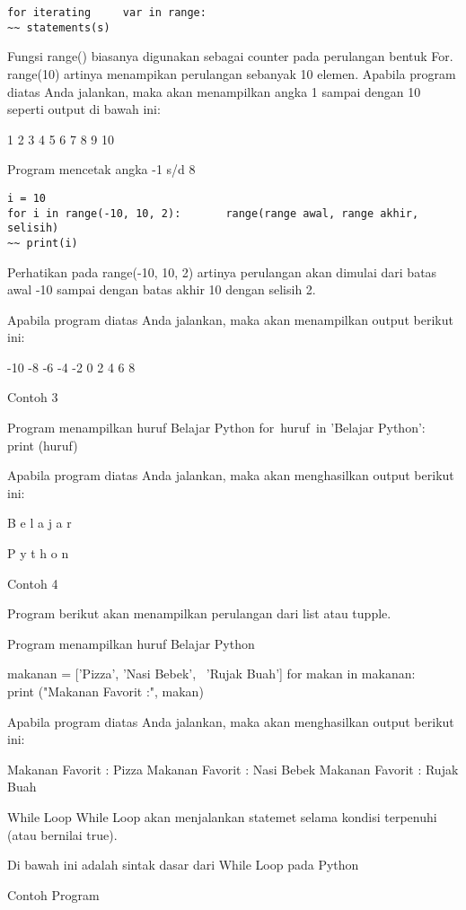 \begin{verbatim} 
for iterating     var in range: 
~~ statements(s) 
\end{verbatim}

Fungsi   range()   biasanya digunakan sebagai counter pada perulangan bentuk For. range(10) artinya menampikan perulangan sebanyak 10 elemen.
Apabila program diatas Anda jalankan, maka akan menampilkan angka 1 sampai dengan 10 seperti output di bawah ini:

 
1 
2 
3 
4 
5 
6 
7 
8 
9 
10 
 
 Program mencetak angka -1 s/d 8 
\begin{verbatim}
i = 10 
for i in range(-10, 10, 2):       range(range awal, range akhir, selisih) 
~~ print(i) 
\end{verbatim}

Perhatikan pada range(-10, 10, 2) artinya perulangan akan dimulai dari batas awal -10 sampai dengan batas akhir 10 dengan selisih 2.

Apabila program diatas Anda jalankan, maka akan menampilkan output berikut ini:

 
-10 
-8 
-6 
-4 
-2 
0 
2 
4 
6 
8 

Contoh 3

 
Program menampilkan huruf Belajar Python 
for~huruf~in 'Belajar Python':    
~~ print (huruf) 

Apabila program diatas Anda jalankan, maka akan menghasilkan output berikut ini:

 
B 
e 
l 
a 
j 
a 
r 
  
P 
y 
t 
h 
o 
n 

Contoh 4

Program berikut akan menampilkan perulangan dari list atau tupple.

 
Program menampilkan huruf Belajar Python 

makanan = ['Pizza', 'Nasi Bebek',~ 'Rujak Buah'] 
for makan in makanan: 
~~ print ("Makanan Favorit :", makan) 

Apabila program diatas Anda jalankan, maka akan menghasilkan output berikut ini:

 
Makanan Favorit : Pizza 
Makanan Favorit : Nasi Bebek 
Makanan Favorit : Rujak Buah 



While Loop 
While Loop akan menjalankan statemet selama kondisi terpenuhi (atau bernilai true).

Di bawah ini adalah sintak dasar dari While Loop pada Python

Contoh Program

